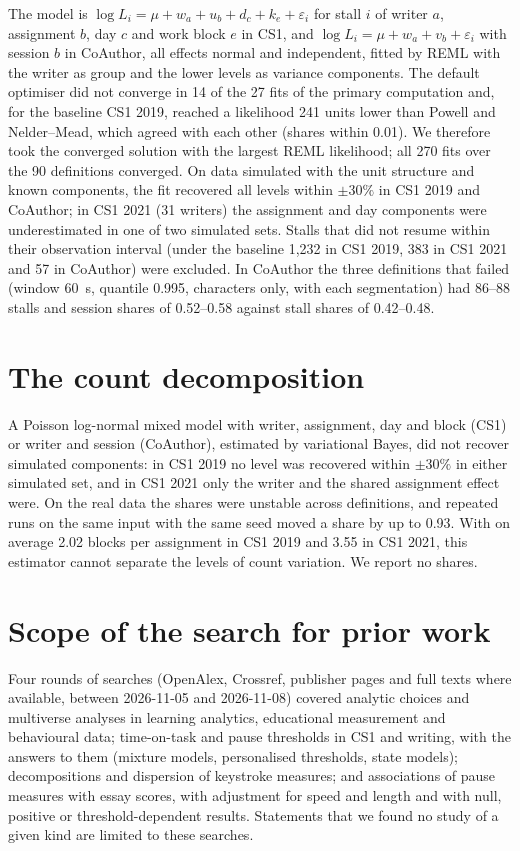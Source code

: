 The model is $\log L_{i} = \mu + w_{a} + u_{b} + d_{c} + k_{e} + \varepsilon_{i}$ for stall $i$ of writer $a$, assignment
$b$, day $c$ and work block $e$ in CS1, and $\log L_{i} = \mu + w_{a} + v_{b} + \varepsilon_{i}$ with session $b$ in
CoAuthor, all effects normal and independent, fitted by REML with the writer as group and the lower levels as variance
components. The default optimiser did not converge in 14 of the 27 fits of the primary computation and, for the
baseline CS1 2019, reached a likelihood 241 units lower than Powell and Nelder--Mead, which agreed with each other
(shares within 0.01). We therefore took the converged solution with the largest REML likelihood; all 270 fits over the
90 definitions converged. On data simulated with the unit structure and known components, the fit recovered all levels
within $\pm 30\%$ in CS1 2019 and CoAuthor; in CS1 2021 (31 writers) the assignment and day components were
underestimated in one of two simulated sets. Stalls that did not resume within their observation interval (under the
baseline 1,232 in CS1 2019, 383 in CS1 2021 and 57 in CoAuthor) were excluded. In CoAuthor the three definitions that
failed (window 60~s, quantile 0.995, characters only, with each segmentation) had 86--88 stalls and session shares of
0.52--0.58 against stall shares of 0.42--0.48.

\section{The count decomposition}
\label{app:counts}

A Poisson log-normal mixed model with writer, assignment, day and block (CS1) or writer and session (CoAuthor),
estimated by variational Bayes, did not recover simulated components: in CS1 2019 no level was recovered within
$\pm 30\%$ in either simulated set, and in CS1 2021 only the writer and the shared assignment effect were. On the real
data the shares were unstable across definitions, and repeated runs on the same input with the same seed moved a share
by up to 0.93. With on average 2.02 blocks per assignment in CS1 2019 and 3.55 in CS1 2021, this estimator cannot
separate the levels of count variation. We report no shares.

\section{Scope of the search for prior work}
\label{app:search}

Four rounds of searches (OpenAlex, Crossref, publisher pages and full texts where available, between 2026-11-05 and
2026-11-08) covered analytic choices and multiverse analyses in learning analytics, educational measurement and
behavioural data; time-on-task and pause thresholds in CS1 and writing, with the answers to them (mixture models,
personalised thresholds, state models); decompositions and dispersion of keystroke measures; and associations of pause
measures with essay scores, with adjustment for speed and length and with null, positive or threshold-dependent
results. Statements that we found no study of a given
kind are limited to these searches.

